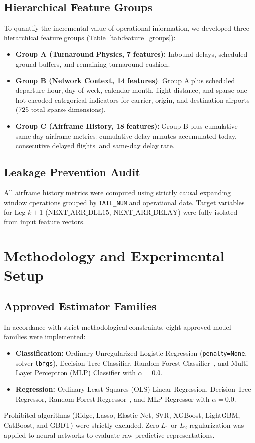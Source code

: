 \documentclass[conference]{IEEEtran}
\begin{document}
\subsection{Hierarchical Feature Groups}
To quantify the incremental value of operational information, we developed three hierarchical feature groups (Table~\ref{tab:feature_groups}):
\begin{itemize}
    \item \textbf{Group A (Turnaround Physics, 7 features):} Inbound delays, scheduled ground buffers, and remaining turnaround cushion.
    \item \textbf{Group B (Network Context, 14 features):} Group A plus scheduled departure hour, day of week, calendar month, flight distance, and sparse one-hot encoded categorical indicators for carrier, origin, and destination airports (725 total sparse dimensions).
    \item \textbf{Group C (Airframe History, 18 features):} Group B plus cumulative same-day airframe metrics: cumulative delay minutes accumulated today, consecutive delayed flights, and same-day delay rate.
\end{itemize}

\subsection{Leakage Prevention Audit}
All airframe history metrics were computed using strictly causal expanding window operations grouped by \texttt{TAIL\_NUM} and operational date. Target variables for Leg $k+1$ ($\text{NEXT\_ARR\_DEL15}$, $\text{NEXT\_ARR\_DELAY}$) were fully isolated from input feature vectors.

\section{Methodology and Experimental Setup}

\subsection{Approved Estimator Families}
In accordance with strict methodological constraints, eight approved model families were implemented:
\begin{itemize}
    \item \textbf{Classification:} Ordinary Unregularized Logistic Regression (\texttt{penalty=None}, solver \texttt{lbfgs}), Decision Tree Classifier, Random Forest Classifier~\cite{breiman2001random}, and Multi-Layer Perceptron (MLP) Classifier with $\alpha = 0.0$.
    \item \textbf{Regression:} Ordinary Least Squares (OLS) Linear Regression, Decision Tree Regressor, Random Forest Regressor~\cite{breiman2001random}, and MLP Regressor with $\alpha = 0.0$.
\end{itemize}
Prohibited algorithms (Ridge, Lasso, Elastic Net, SVR, XGBoost, LightGBM, CatBoost, and GBDT) were strictly excluded. Zero $L_1$ or $L_2$ regularization was applied to neural networks to evaluate raw predictive representations.
\end{document}
